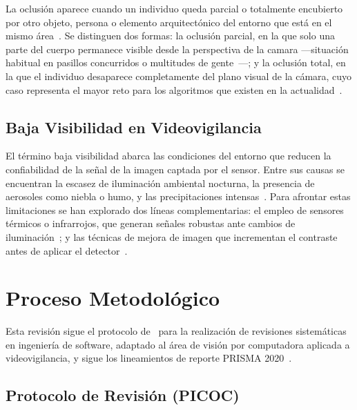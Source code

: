 \documentclass[12pt, a4paper]{article}
\begin{document}
La oclusi\'{o}n aparece cuando un individuo queda parcial o totalmente
encubierto por otro objeto, persona o elemento arquitect\'{o}nico del
entorno que est\'{a} en el mismo \'{a}rea~\cite{E30}. Se distinguen
dos formas: la oclusi\'{o}n parcial, en la que solo una parte
del cuerpo permanece visible desde la perspectiva de la camara ---situaci\'{o}n habitual en pasillos
concurridos o multitudes de gente~\cite{E28, E29}---; y la oclusi\'{o}n
total, en la que el individuo desaparece completamente del plano visual
de la c\'{a}mara, cuyo caso representa el mayor reto para los
algoritmos que existen en la actualidad~\cite{E27, E11}.

\subsection{Baja Visibilidad en Videovigilancia }

El t\'{e}rmino baja visibilidad abarca las condiciones del entorno
que reducen la confiabilidad de la se\~{n}al de la imagen captada por el
sensor. Entre sus causas se encuentran la escasez de iluminaci\'{o}n
ambiental nocturna, la presencia de aerosoles como niebla o humo, y
las precipitaciones intensas~\cite{E21, E12, E13}. Para afrontar estas
limitaciones se han explorado dos l\'{i}neas complementarias: el empleo
de sensores t\'{e}rmicos o infrarrojos, que generan se\~{n}ales
robustas ante cambios de iluminaci\'{o}n~\cite{E34, E35, E14}; y las
t\'{e}cnicas de mejora de imagen que incrementan el contraste antes de
aplicar el detector~\cite{E21}.

\section{Proceso Metodol\'{o}gico}
\label{sec:metodo}

Esta revisi\'{o}n sigue el protocolo de~\cite{Kitchenham2007} para la
realizaci\'{o}n de revisiones sistem\'{a}ticas en ingenier\'{i}a de
software, adaptado al \'{a}rea de visi\'{o}n por computadora aplicada
a videovigilancia, y sigue los lineamientos de reporte PRISMA
2020~\cite{Page2021}.

\subsection{Protocolo de Revisi\'{o}n (PICOC)}
\end{document}
